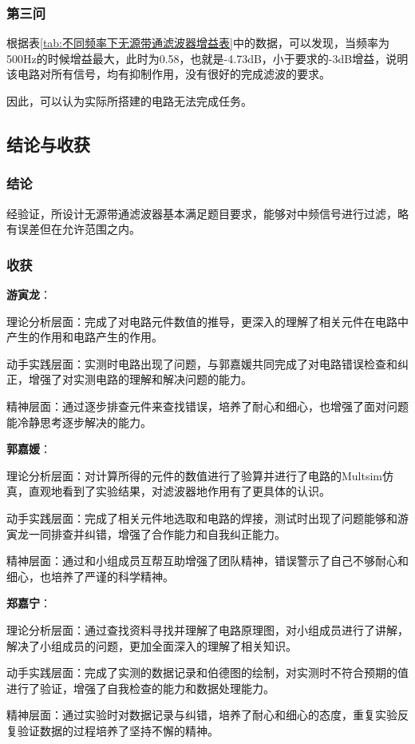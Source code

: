\documentclass[./测控三级项目.tex]{subfiles} %
\begin{document}
		\subsubsection{第三问}
			根据表\ref{tab:不同频率下无源带通滤波器增益表}中的数据，可以发现，当频率为500Hz的时候增益最大，此时为0.58，也就是-4.73dB，小于要求的-3dB增益，说明该电路对所有信号，均有抑制作用，没有很好的完成滤波的要求。\par
			因此，可以认为实际所搭建的电路无法完成任务。
	\subsection{结论与收获}
		\subsubsection{结论}
		经验证，所设计无源带通滤波器基本满足题目要求，能够对中频信号进行过滤，略有误差但在允许范围之内。
	\subsubsection{收获}
	\textbf{游寅龙}：\par
	理论分析层面：完成了对电路元件数值的推导，更深入的理解了相关元件在电路中产生的作用和电路产生的作用。\par
	动手实践层面：实测时电路出现了问题，与郭嘉媛共同完成了对电路错误检查和纠正，增强了对实测电路的理解和解决问题的能力。\par
	精神层面：通过逐步排查元件来查找错误，培养了耐心和细心，也增强了面对问题能冷静思考逐步解决的能力。\par
	\textbf{郭嘉媛}：\par
	理论分析层面：对计算所得的元件的数值进行了验算并进行了电路的Multsim仿真，直观地看到了实验结果，对滤波器地作用有了更具体的认识。\par
	动手实践层面：完成了相关元件地选取和电路的焊接，测试时出现了问题能够和游寅龙一同排查并纠错，增强了合作能力和自我纠正能力。\par
	精神层面：通过和小组成员互帮互助增强了团队精神，错误警示了自己不够耐心和细心，也培养了严谨的科学精神。\par
	\textbf{郑嘉宁}：\par
	理论分析层面：通过查找资料寻找并理解了电路原理图，对小组成员进行了讲解，解决了小组成员的问题，更加全面深入的理解了相关知识。\par
	动手实践层面：完成了实测的数据记录和伯德图的绘制，对实测时不符合预期的值进行了验证，增强了自我检查的能力和数据处理能力。\par
	精神层面：通过实验时对数据记录与纠错，培养了耐心和细心的态度，重复实验反复验证数据的过程培养了坚持不懈的精神。
	
	
	
\end{document}
